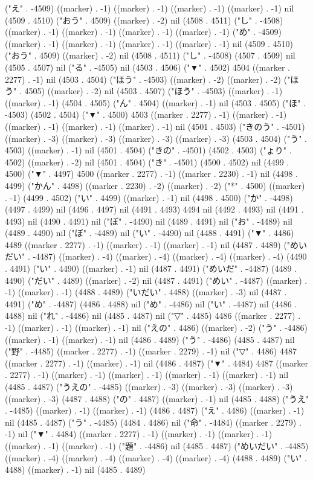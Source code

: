 ("え" . -4509) ((marker) . -1) ((marker) . -1) ((marker) . -1) ((marker) . -1) nil (4509 . 4510) ("おう" . 4509) ((marker) . -2) nil (4508 . 4511) ("し" . -4508) ((marker) . -1) ((marker) . -1) ((marker) . -1) ((marker) . -1) ("め" . -4509) ((marker) . -1) ((marker) . -1) ((marker) . -1) ((marker) . -1) nil (4509 . 4510) ("おう" . 4509) ((marker) . -2) nil (4508 . 4511) ("し" . -4508) (4507 . 4509) nil (4505 . 4507) nil ("る" . -4505) nil (4503 . 4506) ("▼" . 4502) 4504 ((marker . 2277) . -1) nil (4503 . 4504) ("ほう" . -4503) ((marker) . -2) ((marker) . -2) ("ほう" . 4505) ((marker) . -2) nil (4503 . 4507) ("ほう" . -4503) ((marker) . -1) ((marker) . -1) (4504 . 4505) ("ん" . 4504) ((marker) . -1) nil (4503 . 4505) ("ほ" . -4503) (4502 . 4504) ("▼" . 4500) 4503 ((marker . 2277) . -1) ((marker) . -1) ((marker) . -1) ((marker) . -1) ((marker) . -1) nil (4501 . 4503) ("きのう" . -4501) ((marker) . -3) ((marker) . -3) ((marker) . -3) ((marker) . -3) (4503 . 4504) ("う" . 4503) ((marker) . -1) nil (4501 . 4504) ("きの" . -4501) (4502 . 4503) ("ょり" . 4502) ((marker) . -2) nil (4501 . 4504) ("き" . -4501) (4500 . 4502) nil (4499 . 4500) ("▼" . 4497) 4500 ((marker . 2277) . -1) ((marker . 2230) . -1) nil (4498 . 4499) ("かん" . 4498) ((marker . 2230) . -2) ((marker) . -2) ("*" . 4500) ((marker) . -1) (4499 . 4502) ("い" . 4499) ((marker) . -1) nil (4498 . 4500) ("か" . -4498) (4497 . 4499) nil (4496 . 4497) nil (4491 . 4493) 4494 nil (4492 . 4493) nil (4491 . 4493) nil (4490 . 4491) nil ("ぼ" . -4490) nil (4489 . 4491) nil ("お" . -4489) nil (4489 . 4490) nil ("ぼ" . -4489) nil ("い" . -4490) nil (4488 . 4491) ("▼" . 4486) 4489 ((marker . 2277) . -1) ((marker) . -1) ((marker) . -1) nil (4487 . 4489) ("めいだい" . -4487) ((marker) . -4) ((marker) . -4) ((marker) . -4) ((marker) . -4) (4490 . 4491) ("い" . 4490) ((marker) . -1) nil (4487 . 4491) ("めいだ" . -4487) (4489 . 4490) ("だい" . 4489) ((marker) . -2) nil (4487 . 4491) ("めい" . -4487) ((marker) . -1) ((marker) . -1) (4488 . 4489) ("いだい" . 4488) ((marker) . -3) nil (4487 . 4491) ("め" . -4487) (4486 . 4488) nil ("め" . -4486) nil ("い" . -4487) nil (4486 . 4488) nil ("れ" . -4486) nil (4485 . 4487) nil ("▽" . 4485) 4486 ((marker . 2277) . -1) ((marker) . -1) ((marker) . -1) nil ("えの" . 4486) ((marker) . -2) ("う" . -4486) ((marker) . -1) ((marker) . -1) nil (4486 . 4489) ("う" . -4486) (4485 . 4487) nil ("野" . -4485) ((marker . 2277) . -1) ((marker . 2279) . -1) nil ("▽" . 4486) 4487 ((marker . 2277) . -1) ((marker) . -1) nil (4486 . 4487) ("▼" . 4484) 4487 ((marker . 2277) . -1) ((marker) . -1) ((marker) . -1) ((marker) . -1) ((marker) . -1) nil (4485 . 4487) ("うえの" . -4485) ((marker) . -3) ((marker) . -3) ((marker) . -3) ((marker) . -3) (4487 . 4488) ("の" . 4487) ((marker) . -1) nil (4485 . 4488) ("うえ" . -4485) ((marker) . -1) ((marker) . -1) (4486 . 4487) ("え" . 4486) ((marker) . -1) nil (4485 . 4487) ("う" . -4485) (4484 . 4486) nil ("命" . -4484) ((marker . 2279) . -1) nil ("▼" . 4484) ((marker . 2277) . -1) ((marker) . -1) ((marker) . -1) ((marker) . -1) ((marker) . -1) ("題" . -4486) nil (4485 . 4487) ("めいだい" . -4485) ((marker) . -4) ((marker) . -4) ((marker) . -4) ((marker) . -4) (4488 . 4489) ("い" . 4488) ((marker) . -1) nil (4485 . 4489) 